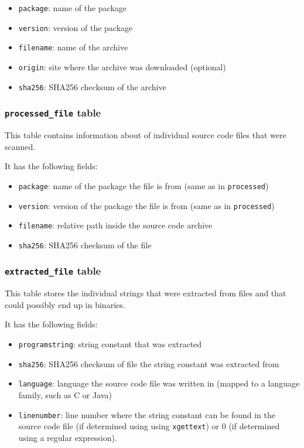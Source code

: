 \documentclass[10pt]{article}
\begin{document}
\begin{itemize}
\item \texttt{package}: name of the package
\item \texttt{version}: version of the package
\item \texttt{filename}: name of the archive
\item \texttt{origin}: site where the archive was downloaded (optional)
\item \texttt{sha256}: SHA256 checksum of the archive
\end{itemize}

\subsubsection{\texttt{processed\_file} table}
This table contains information about of individual source code files that were
scanned.

It has the following fields:

\begin{itemize}
\item \texttt{package}: name of the package the file is from (same as in
\texttt{processed})
\item \texttt{version}: version of the package the file is from (same as in
\texttt{processed})
\item \texttt{filename}: relative path inside the source code archive
\item \texttt{sha256}: SHA256 checksum of the file
\end{itemize}

\subsubsection{\texttt{extracted\_file} table}
This table stores the individual strings that were extracted from files and
that could possibly end up in binaries.

It has the following fields:

\begin{itemize}
\item \texttt{programstring}: string constant that was extracted
\item \texttt{sha256}: SHA256 checksum of file the string constant was
extracted from
\item \texttt{language}: language the source code file was written in (mapped
to a language family, such as C or Java)
\item \texttt{linenumber}: line number where the string constant can be found
in the source code file (if determined using using \texttt{xgettext}) or $0$
(if determined using a regular expression).
\end{itemize}
\end{document}

